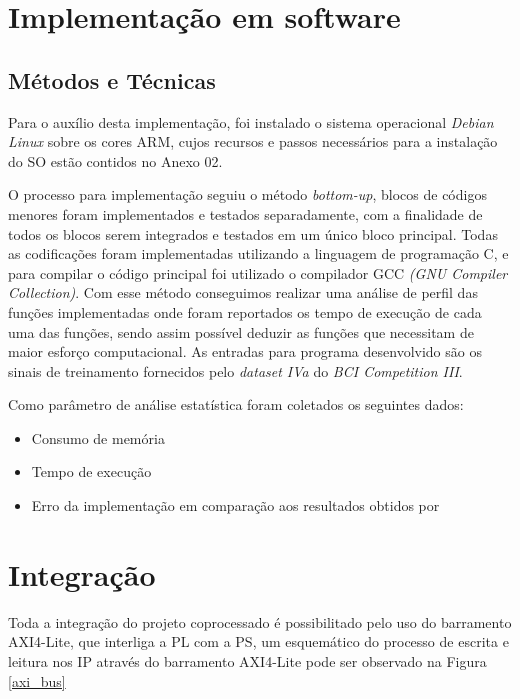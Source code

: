 \section{Implementação em software}

\subsection{Métodos e Técnicas}
Para o auxílio desta implementação, foi instalado o sistema operacional \textit{Debian Linux} sobre os cores ARM, cujos recursos e passos necessários
para a instalação do SO estão contidos no Anexo 02.

O processo para implementação seguiu o método \textit{bottom-up}, blocos de códigos menores foram implementados e testados separadamente, com a finalidade de todos os blocos serem integrados e testados em um único bloco principal. Todas as codificações foram implementadas utilizando a linguagem de programação C, e para compilar o código principal foi utilizado o compilador GCC \textit{(GNU Compiler Collection)}. Com esse método conseguimos realizar uma análise de perfil das funções implementadas onde foram reportados os tempo de execução de cada uma das funções, sendo assim possível deduzir as funções que necessitam de maior esforço computacional. As entradas para programa desenvolvido são os sinais de treinamento fornecidos pelo \textit{dataset IVa} do \textit{BCI Competition III}.

Como parâmetro de análise estatística foram coletados os seguintes dados:

\begin{itemize}[noitemsep]
\item Consumo de memória
\item Tempo de execução
\item Erro da implementação em comparação aos resultados obtidos por \cite{F.Lotte}
\end{itemize}

\section{Integração}
Toda a integração do projeto coprocessado é possibilitado pelo uso do barramento AXI4-Lite, que interliga a PL com a PS, 
um esquemático do processo de escrita e leitura nos IP através do barramento AXI4-Lite pode ser observado na Figura \ref{axi_bus}
\newpage

